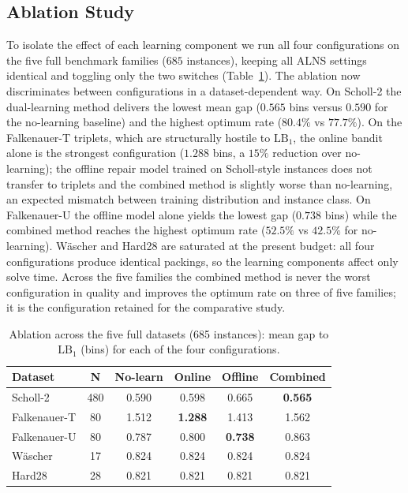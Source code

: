 \documentclass[conference]{IEEEtran}
\begin{document}
\subsection{Ablation Study}
To isolate the effect of each learning component we run all four configurations
on the five full benchmark families ($685$ instances), keeping all ALNS
settings identical and toggling only the two switches
(Table~\ref{tab:ablation}). The ablation now discriminates between configurations
in a dataset-dependent way. On Scholl-2 the dual-learning method delivers the
lowest mean gap ($0.565$ bins versus $0.590$ for the no-learning baseline) and
the highest optimum rate ($80.4\%$ vs $77.7\%$). On the Falkenauer-T triplets,
which are structurally hostile to $\mathrm{LB}_1$, the online bandit alone is
the strongest configuration ($1.288$ bins, a $15\%$ reduction over no-learning);
the offline repair model trained on Scholl-style instances does not transfer
to triplets and the combined method is slightly worse than no-learning, an
expected mismatch between training distribution and instance class. On
Falkenauer-U the offline model alone yields the lowest gap ($0.738$ bins) while
the combined method reaches the highest optimum rate ($52.5\%$ vs $42.5\%$ for
no-learning). W\"ascher and Hard28 are saturated at the present budget: all four
configurations produce identical packings, so the learning components affect
only solve time. Across the five families the combined method is never the
worst configuration in quality and improves the optimum rate on three of five
families; it is the configuration retained for the comparative study.

\begin{table}[htbp]
	\caption{Ablation across the five full datasets (685 instances): mean gap
		to $\mathrm{LB}_1$ (bins) for each of the four configurations.}
	\label{tab:ablation}
	\centering
	\begin{tabular}{l c c c c c}
		\hline
		\textbf{Dataset} & \textbf{N} & \textbf{No-learn} & \textbf{Online} & \textbf{Offline} & \textbf{Combined} \\
		\hline
		Scholl-2         & 480        & 0.590             & 0.598           & 0.665            & \textbf{0.565}    \\
		Falkenauer-T     & 80         & 1.512             & \textbf{1.288}  & 1.413            & 1.562             \\
		Falkenauer-U     & 80         & 0.787             & 0.800           & \textbf{0.738}   & 0.863             \\
		W\"ascher        & 17         & 0.824             & 0.824           & 0.824            & 0.824             \\
		Hard28           & 28         & 0.821             & 0.821           & 0.821            & 0.821             \\
		\hline
	\end{tabular}
\end{table}
\end{document}
